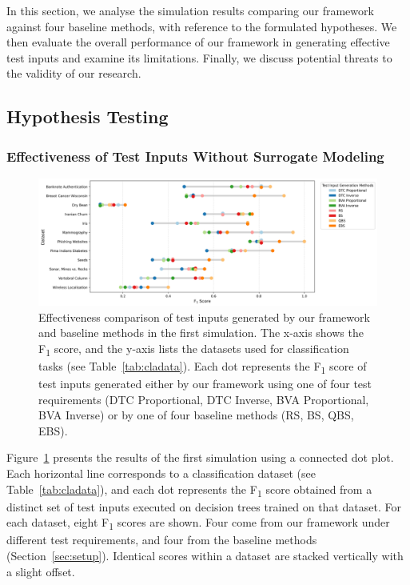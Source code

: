 \documentclass[
]{ceurart}
\theoremstyle{definition}
\begin{document}
In this section, we analyse the simulation results comparing our framework against four baseline methods, with reference to the formulated hypotheses. We then evaluate the overall performance of our framework in generating effective test inputs and examine its limitations. Finally, we discuss potential threats to the validity of our research.
\subsection{Hypothesis Testing}

\subsubsection{Effectiveness of Test Inputs Without Surrogate Modeling}
\begin{figure}
\centering
\includegraphics[width=\linewidth]{img/f1_score_plot}
\caption{Effectiveness comparison of test inputs generated by our framework and baseline methods in the first simulation. The x-axis shows the F\textsubscript{1} score, and the y-axis lists the datasets used for classification tasks (see Table~\ref{tab:cladata}). Each dot represents the F\textsubscript{1} score of test inputs generated either by our framework using one of four test requirements (DTC Proportional, DTC Inverse, BVA Proportional, BVA Inverse) or by one of four baseline methods (RS, BS, QBS, EBS).}
\label{fig:f1}
\end{figure}
Figure~\ref{fig:f1} presents the results of the first simulation using a connected dot plot. Each horizontal line corresponds to a classification dataset (see Table~\ref{tab:cladata}), and each dot represents the F\textsubscript{1} score obtained from a distinct set of test inputs executed on decision trees trained on that dataset. For each dataset, eight F\textsubscript{1} scores are shown. Four come from our framework under different test requirements, and four from the baseline methods (Section~\ref{sec:setup}). Identical scores within a dataset are stacked vertically with a slight offset.
\end{document}
